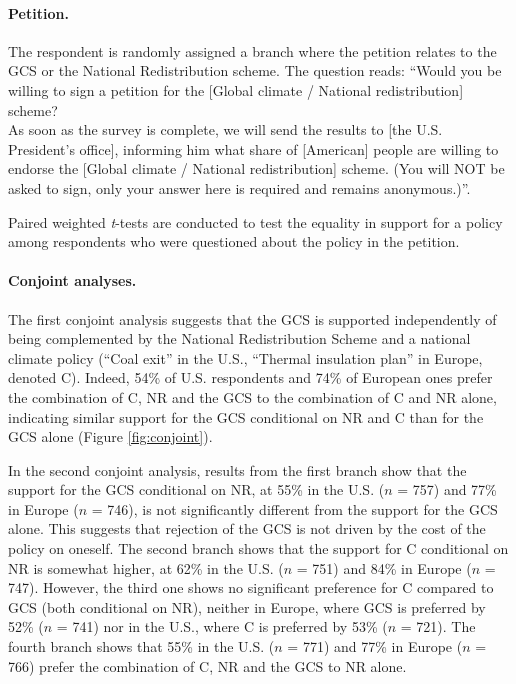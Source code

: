 \begin{bibunit}
\begin{small}
\paragraph{\small Petition.}
The respondent is randomly assigned a branch where the petition relates to the GCS or the National Redistribution scheme. The question reads: ``Would you be willing to sign a petition for the [Global climate / National redistribution] scheme? \\ As soon as the survey is complete, we will send the results to [the U.S. President's office], informing him what share of [American] people are willing to endorse the [Global climate / National redistribution] scheme. (You will NOT be asked to sign, only your answer here is required and remains anonymous.)''. 

Paired weighted \textit{t}-tests are conducted to test the equality in support for a policy among respondents who were questioned about the policy in the petition.

\paragraph{\small Conjoint analyses.}
The first conjoint analysis suggests that the GCS is supported independently of being complemented by the National Redistribution Scheme and a national climate policy (``Coal exit'' in the U.S., ``Thermal insulation plan'' in Europe, denoted C). Indeed, 54\% of %
U.S. respondents and 74\% of %
European ones prefer the combination of C, NR and the GCS to the combination of C and NR alone, indicating similar support for the GCS conditional on NR and C than for the GCS alone (Figure \ref{fig:conjoint}). 

In the second conjoint analysis, results from the first branch show that the support for the GCS conditional on NR, at 55\% in the U.S. ($n$ = 757) and 77\% in Europe ($n$ = 746), is not significantly different from the support for the GCS alone. This suggests that rejection of the GCS is not driven by the cost of the policy on oneself. The second branch shows that the support for C conditional on NR is somewhat higher, at 62\% in the U.S. ($n$ = 751) and 84\% in Europe ($n$ = 747). However, the third one shows no significant preference for C compared to GCS (both conditional on NR), neither in Europe, where GCS is preferred by 52\% ($n$ = 741) nor in the U.S., where C is preferred by 53\% ($n$ = 721). The fourth branch shows that 55\% in the U.S. ($n$ = 771) and 77\% in Europe ($n$ = 766) prefer the combination of C, NR and the GCS to NR alone.


\end{small}
\end{bibunit}
